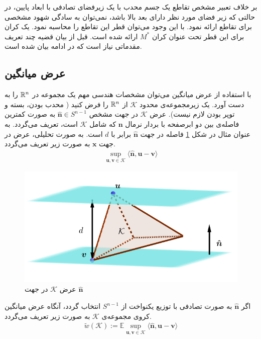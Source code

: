 بر خلاف تعبیر مشخص تقاطع یک جسم محدب با یک زیرفضای تصادفی با ابعاد پایین،‌ در حالتی که زیر فضای مورد نظر دارای بعد بالا باشد، نمی‌توان به سادگی شهود مشخصی برای تقاطع ارائه نمود. با این وجود می‌توان قطر این تقاطع را محاسبه نمود. یک کران برای این قطر تحت عنوان کران
$M^{\ast}$ 
ارائه شده است. قبل از بیان قضیه چند تعریف مقدماتی نیاز است که در ادامه بیان شده است.

\subsection{عرض میانگین}
با استفاده از عرض میانگین
می‌توان مشخصات هندسی مهم یک مجموعه در 
$\mathbb{R}^n$
را به دست آورد. 
یک زیرمجموعه‌ی محدود 
$\mathcal{K}$
از 
$\mathbb{R}^n$
را فرض کنید ( محدب بودن، بسته و توپر بودن لازم نیست). عرض 
$\mathcal{K}$
در جهت مشخص
$\hat{\bm{n}}\in S^{n-1}$
به صورت کمترین فاصله‌ی بین دو ابرصفحه با بردار نرمال
$\bm{n}$
که شامل 
$\mathcal{K}$
است، تعریف می‌گردد. به عنوان مثال در شکل
\ref{fig8}
فاصله در جهت
$\hat{\bm{n}}$
برابر با 
$d$
است. به صورت تحلیلی، عرض در جهت 
$\bm{x}$
به صورت زیر تعریف می‌گردد.
\begin{align}
	\sup_{\bm{u},\bm{v}\in \mathcal{K}} \langle \hat{\bm{n}}, \bm{u}-\bm{v}  \rangle
\end{align}

\begin{figure}
\centering
\includegraphics[scale=0.35]{Images/ch2/fig8.png}
\caption{عرض   
$\mathcal{K}$
در جهت
$\hat{\bm{n}}$
}
\label{fig8}
\end{figure}


اگر 
$\hat{\bm{n}}$
به صورت تصادفی با توزیع یکنواخت از 
$S^{n-1}$
انتخاب گردد، آنگاه عرض میانگین کروی
مجموعه‌ی
$\mathcal{K}$
به صورت زیر تعریف می‌گردد.
\begin{align} 
\label{eq:eq13}
\tilde{w}\left(\mathcal{K}\right) := \mathbb{E} \sup_{\bm{u},\bm{v}\in \mathcal{K}} \langle \hat{\bm{n}}, \bm{u}-\bm{v}  \rangle
\end{align} 

